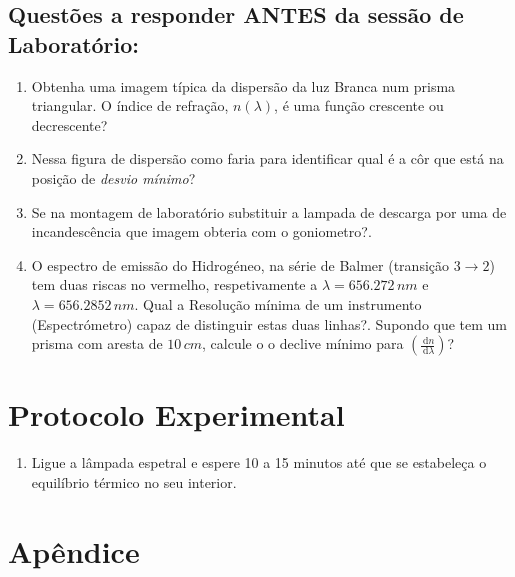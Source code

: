 \documentclass[a4paper,12pt]{article}  %
\newcommand{\ud}{\,\mathrm{d}}
\begin{document}
\subsection{\sf Questões a responder ANTES da sessão de Laboratório:}
\begin{enumerate}
\item Obtenha uma imagem típica da dispersão da luz Branca num prisma triangular. O índice de refração, $n(\lambda)$, é uma função crescente ou decrescente?
\item Nessa figura de dispersão como faria para  identificar qual é a côr que está na posição de \emph{desvio mínimo}?
\item Se na montagem de laboratório substituir a lampada de descarga por uma de incandescência que imagem obteria com o goniometro?. 
\item O espectro de emissão do Hidrogéneo, na série de Balmer (transição $3 \to 2$) tem duas riscas no vermelho, respetivamente a $\lambda = 656.272\, nm$ e $\lambda = 656.2852\,nm$.
Qual a Resolução mínima de um instrumento (Espectrómetro) capaz de distinguir estas duas linhas?. Supondo que tem um prisma com aresta de $10\,cm$, calcule o 
o declive mínimo para $\left(\frac{\ud n}{\ud \lambda} \right)$?
\end{enumerate}


\section{\sf Protocolo Experimental}


\begin{enumerate}
\item Ligue  a  lâmpada  espetral  e  espere  10  a  15  minutos    até  que  se  estabeleça  o 
equilíbrio térmico no seu interior. 

\end{enumerate}

\section*{\sf Apêndice}
\end{document}

